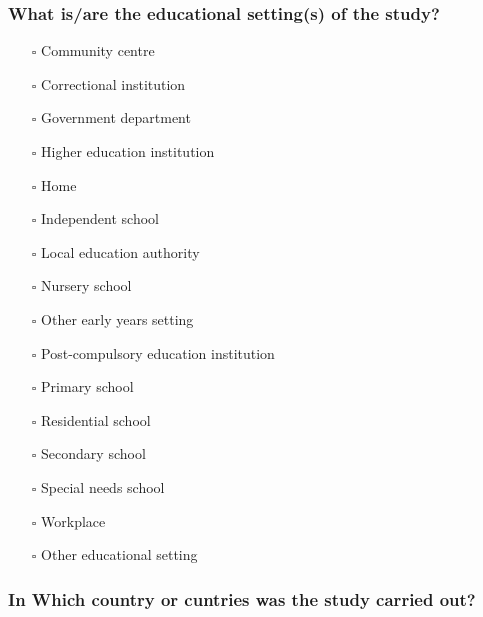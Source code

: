 \documentclass[
  doc, a4paper]{apa7}
\providecommand{\tightlist}{%
  \setlength{\itemsep}{0pt}\setlength{\parskip}{0pt}}
\begin{document}
\subsubsection{What is/are the educational setting(s) of the study?}\label{what-isare-the-educational-settings-of-the-study}

\begin{itemize}
\tightlist
\item[$\square$]
  Community centre\\
\item[$\square$]
  Correctional institution\\
\item[$\square$]
  Government department\\
\item[$\square$]
  Higher education institution\\
\item[$\square$]
  Home\\
\item[$\square$]
  Independent school\\
\item[$\square$]
  Local education authority\\
\item[$\square$]
  Nursery school\\
\item[$\square$]
  Other early years setting\\
\item[$\square$]
  Post-compulsory education institution\\
\item[$\square$]
  Primary school\\
\item[$\square$]
  Residential school\\
\item[$\square$]
  Secondary school\\
\item[$\square$]
  Special needs school\\
\item[$\square$]
  Workplace\\
\item[$\square$]
  Other educational setting
\end{itemize}

\subsubsection{In Which country or cuntries was the study carried out?}\label{in-which-country-or-cuntries-was-the-study-carried-out}
\end{document}
